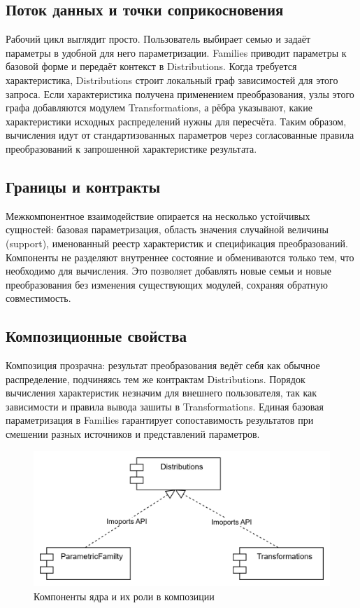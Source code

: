 \subsection{Поток данных и точки соприкосновения}

Рабочий цикл выглядит просто. Пользователь выбирает семью и задаёт параметры в удобной для него параметризации. 
Families приводит параметры к базовой форме и передаёт контекст в Distributions. 
Когда требуется характеристика, Distributions строит локальный граф зависимостей для этого запроса. 
Если характеристика получена применением преобразования, узлы этого графа добавляются модулем Transformations, а рёбра указывают, какие характеристики исходных распределений нужны для пересчёта. 
Таким образом, вычисления идут от стандартизованных параметров через согласованные правила преобразований к запрошенной характеристике результата.

\subsection{Границы и контракты}

Межкомпонентное взаимодействие опирается на несколько устойчивых сущностей: 
базовая параметризация, область значения случайной величины (support), именованный реестр характеристик и спецификация преобразований. 
Компоненты не разделяют внутреннее состояние и обмениваются только тем, что необходимо для вычисления. 
Это позволяет добавлять новые семьи и новые преобразования без изменения существующих модулей, сохраняя обратную совместимость.

\subsection{Композиционные свойства}

Композиция прозрачна: результат преобразования ведёт себя как обычное распределение, подчиняясь тем же контрактам Distributions. 
Порядок вычисления характеристик незначим для внешнего пользователя, так как зависимости и правила вывода зашиты в Transformations. 
Единая базовая параметризация в Families гарантирует сопоставимость результатов при смешении разных источников и представлений параметров.

\begin{figure}[H]
  \centering
  \includegraphics[width=.85\linewidth]{assets/images/Composition.png}
  \caption{Компоненты ядра и их роли в композиции}
  \label{fig:kernel-components}
\end{figure}